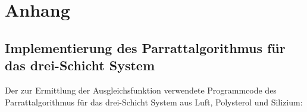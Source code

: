 \section{Anhang}
\label{sec:Anhang}
\subsection{Implementierung des Parrattalgorithmus für das drei-Schicht System}
Der zur Ermittlung der Ausgleichsfunktion verwendete Programmcode des Parrattalgorithmus für das drei-Schicht System aus Luft, Polysterol und Silizium:


